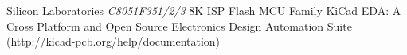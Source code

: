 \begin{thebibliography}{99}

 Silicon Laboratories \emph{C8051F351/2/3} 8K ISP Flash MCU Family
 KiCad EDA: A Cross Platform and Open Source Electronics Design Automation Suite (http://kicad-pcb.org/help/documentation)

\end{thebibliography}




